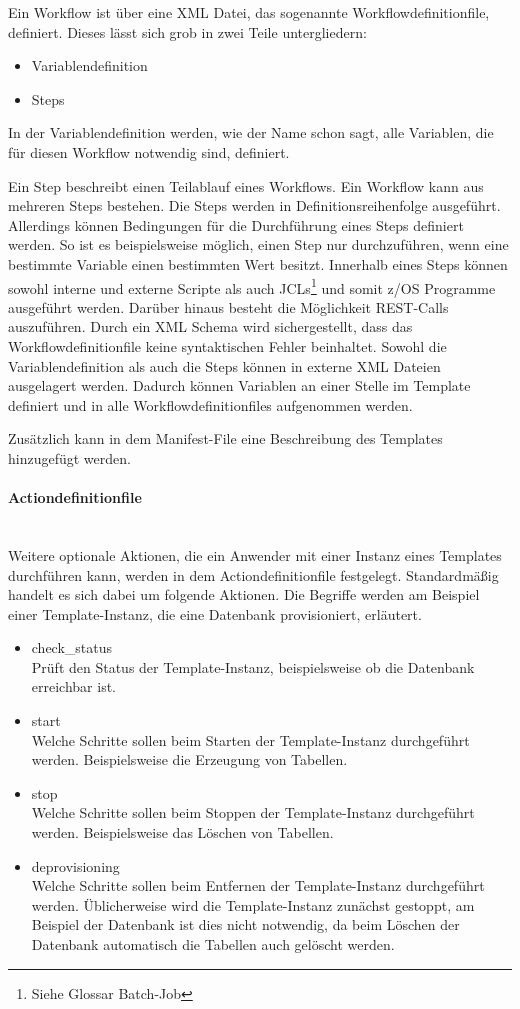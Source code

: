 Ein Workflow ist über eine XML Datei, das sogenannte \glqq Workflowdefinitionfile\grqq, definiert.
Dieses lässt sich grob in zwei Teile untergliedern:
\begin{itemize}
\item Variablendefinition
\item Steps
\end{itemize}
In der Variablendefinition werden, wie der Name schon sagt, alle Variablen, die für diesen Workflow notwendig sind, definiert.

Ein Step beschreibt einen Teilablauf eines Workflows.
Ein Workflow kann aus mehreren Steps bestehen.
Die Steps werden in Definitionsreihenfolge ausgeführt.
Allerdings können Bedingungen für die Durchführung eines Steps definiert werden.
So ist es beispielsweise möglich, einen Step nur durchzuführen, wenn eine bestimmte Variable einen bestimmten Wert besitzt.
Innerhalb eines Steps können sowohl interne und externe Scripte als auch JCLs\footnote{Siehe Glossar \Gls{Batch-Job}} und somit z/OS Programme ausgeführt werden.
Darüber hinaus besteht die Möglichkeit REST-Calls auszuführen.
Durch ein XML Schema wird sichergestellt, dass das Workflowdefinitionfile keine syntaktischen Fehler beinhaltet.
Sowohl die Variablendefinition als auch die Steps können in externe XML Dateien ausgelagert werden.
Dadurch können Variablen an einer Stelle im Template definiert und in alle Workflowdefinitionfiles aufgenommen werden.
\cite[S. 140]{Rotthove.2018}

Zusätzlich kann in dem Manifest-File eine Beschreibung des Templates hinzugefügt werden.
\cite{.26.2.2020}
\paragraph{\glqq Actiondefinitionfile\grqq} ~\\
Weitere optionale Aktionen, die ein Anwender mit einer Instanz eines Templates durchführen kann, werden in dem Actiondefinitionfile festgelegt.
Standardmäßig handelt es sich dabei um folgende Aktionen.
Die Begriffe werden am Beispiel einer Template-Instanz, die eine Datenbank provisioniert, erläutert.
\begin{itemize}
\item check\_status\\
Prüft den Status der Template-Instanz, beispielsweise ob die Datenbank erreichbar ist.
\item start\\
Welche Schritte sollen beim Starten der Template-Instanz durchgeführt werden.
Beispielsweise die Erzeugung von Tabellen.
\item stop\\
Welche Schritte sollen beim Stoppen der Template-Instanz durchgeführt werden.
Beispielsweise das Löschen von Tabellen.
\item deprovisioning\\
Welche Schritte sollen beim Entfernen der Template-Instanz durchgeführt werden.
Üblicherweise wird die Template-Instanz zunächst gestoppt, am Beispiel der Datenbank ist dies nicht notwendig, da beim Löschen der Datenbank automatisch die Tabellen auch gelöscht werden.
\end{itemize}

